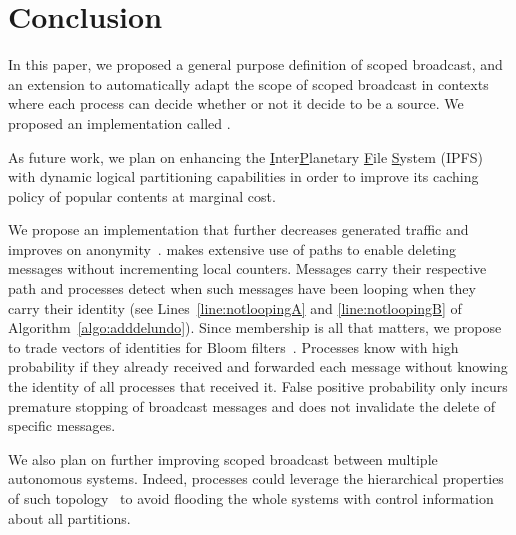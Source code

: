 
\section{Conclusion}
\label{sec:conclusion}

In this paper, we proposed a general purpose definition of scoped
broadcast, and an extension to automatically adapt the scope of scoped
broadcast in contexts where each process can decide whether or not it
decide to be a source. We proposed an implementation called \NAME.

As future work, we plan on enhancing the
\underline{I}nter\underline{P}lanetary \underline{F}ile
\underline{S}ystem (IPFS)~\cite{henningsen2020mapping} with dynamic
logical partitioning capabilities in order to improve its caching
policy of popular contents at marginal cost.

\noindent We propose an implementation that further decreases
generated traffic and improves on
anonymity~\cite{whitaker2002forwarding}.  \NAME makes extensive use of
paths to enable deleting messages without incrementing local
counters. Messages carry their respective path and processes detect
when such messages have been looping when they carry their identity
(see Lines~\ref{line:notloopingA} and \ref{line:notloopingB} of
Algorithm~\ref{algo:adddelundo}). Since membership is all that
matters, we propose to trade vectors of identities for Bloom
filters~\cite{almeida2007scalable}. Processes know with high
probability if they already received and forwarded each message
without knowing the identity of all processes that received it.  False
positive probability only incurs premature stopping of broadcast
messages and does not invalidate the delete of specific
messages. 

\noindent We also plan on further improving scoped broadcast between
multiple autonomous systems. Indeed, processes could leverage the
hierarchical properties of such topology~\cite{nur2018geography} to
avoid flooding the whole systems with control information about all
partitions.

